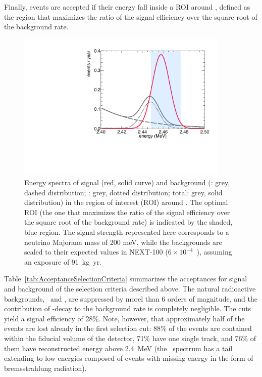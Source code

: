 Finally, events are accepted if their energy fall inside a ROI around \Qbb, defined as the region that maximizes the ratio of the signal efficiency over the square root of the background rate.
 
\begin{figure}
\centering
\includegraphics[width=0.9\textwidth]{img2/Next100ROI.pdf}
\caption{Energy spectra of signal (red, solid curve) and background (\Tl: grey, dashed distribution; \Bi: grey, dotted distribution; total: grey, solid distribution) in the region of interest (ROI) around \Qbb. The optimal ROI (the one that maximizes the ratio of the signal efficiency over the square root of the background rate) is indicated by the shaded, blue region. The signal strength represented here corresponds to a neutrino Majorana mass of 200 meV, while the backgrounds are scaled to their expected values in NEXT-100 ($6\times10^{-4}$~\ckky), assuming an exposure of 91~kg~yr.} \label{fig:ROI}
\end{figure}


Table~\ref{tab:AcceptanceSelectionCriteria} summarizes the acceptances for signal and background of the selection criteria described above. The natural radioactive backgrounds, \TL\ and \BI, are suppressed by morel than 6 orders of magnitude, and the contribution of \bbtnu-decay to the background rate is completely negligible. The cuts yield a signal efficiency of 28\%. Note, however, that approximately half of the events are lost already in the first selection cut: 88\% of the events are contained within the fiducial volume of the detector, 71\% have one single track, and 76\% of them have reconstructed energy above 2.4~MeV (the \bbonu\ spectrum has a tail extending to low energies composed of events with missing energy in the form of bremsstrahlung radiation).

